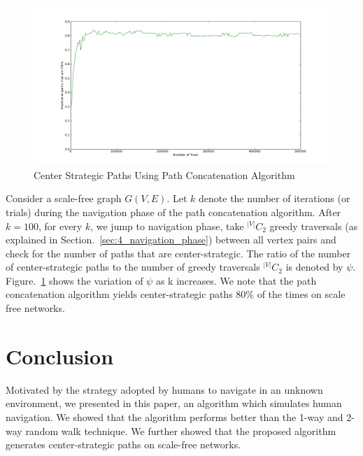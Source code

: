 \documentclass[10pt, conference, compsocconf]{IEEEtran}
\begin{document}
\begin{figure}[htp!]
\begin{center}
\includegraphics[width=.4\textheight]{Results/barabasi_csp.png}
\caption{Center Strategic Paths Using Path Concatenation Algorithm}
\label{4_mainplot}
\end{center}
\end{figure}

Consider a scale-free graph $G(V,E)$. Let $k$ denote the number of iterations (or trials) during the navigation phase of the path concatenation algorithm. After $k=100$, for every $k$, we jump to navigation phase, take $^{|V|}C_2$ greedy traversals (as explained in Section.~\ref{sec:4_navigation_phase}) between all vertex pairs and check for the number of paths that are center-strategic. The ratio of the number of center-strategic paths to the number of greedy traversals $^{|V|}C_2$ is denoted by $\psi$.\\

Figure.~\ref{4_mainplot} shows the variation of $\psi$ as k increases. We note that the path concatenation algorithm yields center-strategic paths 80\% of the times on scale free networks.\\

\section{Conclusion}
\label{sec:4_conclusion}

Motivated by the strategy adopted by humans to navigate in an unknown environment, we presented in this paper, an algorithm which simulates human navigation. We showed that the algorithm performs better than the 1-way and 2-way random walk technique. We further showed that the proposed algorithm generates center-strategic paths on scale-free networks.\\
\end{document}
